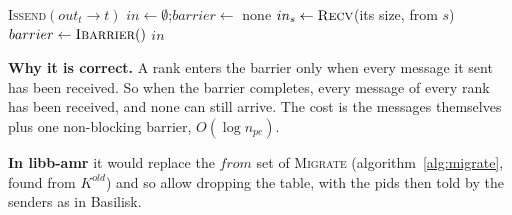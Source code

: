 \begin{algorithm}[H]
  \caption{\textsc{NBX}$(to, out)$: receive from whoever sends}
  \label{alg:nbx}
  \begin{algorithmic}[1]
      \State \textsc{Issend}$(out_t \to t)$ 
    \EndFor
    \State $in \gets \emptyset$;\quad $barrier \gets$ none
    \Loop
        \State $in_s \gets \textsc{Recv}$(its size, from $s$)
      \EndIf
          \State $barrier \gets \textsc{Ibarrier}()$
        \EndIf
        \State \Return $in$ 
      \EndIf
    \EndLoop
  \end{algorithmic}
\end{algorithm}

\textbf{Why it is correct.} A rank enters the barrier only when every
message it sent has been received. So when the barrier completes, every
message of every rank has been received, and none can still arrive. The
cost is the messages themselves plus one non-blocking barrier,
$O(\log n_{pe})$.

\textbf{In libb-amr} it would replace the $from$ set of \textsc{Migrate}
(algorithm~\ref{alg:migrate}, found from $K^{old}$) and so allow dropping
the table, with the pids then told by the senders as in Basilisk.
